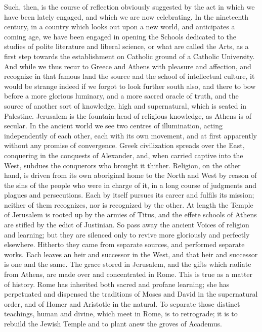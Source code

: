 Such, then, is the course of reflection obviously suggested by the
act in which we have been lately engaged, and which we are now
celebrating. In the nineteenth century, in a country which looks out
upon a new world, and anticipates a coming age, we have been engaged
in opening the Schools dedicated to the studies of polite literature
and liberal science, or what are called the Arts, as a first step
towards the establishment on Catholic ground of a Catholic University.
And while we thus recur to Greece and Athens with pleasure and
affection, and recognize in that famous land the source and the school
of intellectual culture, it would be strange indeed if we forgot to
look further south also, and there to bow before a more glorious
luminary, and a more sacred oracle of truth, and the source of another
sort of knowledge, high and supernatural, which is seated in
Palestine. Jerusalem is the fountain-head of religious knowledge, as
Athens is of secular. In the ancient world we see two centres of
illumination, acting independently of each other, each with its own
movement, and at first apparently without any promise of convergence.
Greek civilization spreads over the East, conquering in the conquests
of Alexander, and, when carried captive into the West, subdues
the conquerors who brought it thither. Religion, on the other hand, is
driven from its own aboriginal home to the North and West by reason of
the sins of the people who were in charge of it, in a long course of
judgments and plagues and persecutions. Each by itself pursues its
career and fulfils its mission; neither of them recognizes, nor is
recognized by the other. At length the Temple of Jerusalem is rooted
up by the armies of Titus, and the effete schools of Athens are
stifled by the edict of Justinian. So pass away the ancient Voices of
religion and learning; but they are silenced only to revive more
gloriously and perfectly elsewhere. Hitherto they came from separate
sources, and performed separate works. Each leaves an heir and
successor in the West, and that heir and successor is one and the
same. The grace stored in Jerusalem, and the gifts which radiate from
Athens, are made over and concentrated in Rome. This is true as a
matter of history. Rome has inherited both sacred and profane
learning; she has perpetuated and dispensed the traditions of Moses
and David in the supernatural order, and of Homer and Aristotle in the
natural. To separate those distinct teachings, human and divine, which
meet in Rome, is to retrograde; it is to rebuild the Jewish Temple and
to plant anew the groves of Academus.

